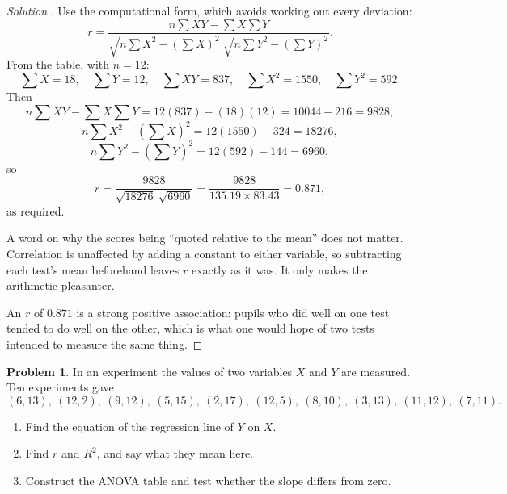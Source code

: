 \documentclass[11pt,a4paper]{article}
\theoremstyle{definition}
\newtheorem{problemx}{Problem}[section]
\newenvironment{problem}{\begin{problemx}}{\end{problemx}}
\newenvironment{solution}
  {\renewcommand{\qedsymbol}{}\begin{proof}[\textit{Solution}.]}
  {\end{proof}}
\begin{document}
\begin{solution}
Use the computational form, which avoids working out every deviation:
\[r=\frac{n\sum XY-\sum X\sum Y}
{\sqrt{n\sum X^2-\left(\sum X\right)^2}\ \sqrt{n\sum Y^2-\left(\sum Y\right)^2}}.\]
From the table, with $n=12$:
\[\sum X=18,\quad \sum Y=12,\quad \sum XY=837,\quad \sum X^2=1550,\quad \sum Y^2=592.\]
Then
\[n\sum XY-\sum X\sum Y = 12(837)-(18)(12)=10044-216=9828,\]
\[n\sum X^2-\left(\sum X\right)^2=12(1550)-324=18276,\]
\[n\sum Y^2-\left(\sum Y\right)^2=12(592)-144=6960,\]
so
\[r=\frac{9828}{\sqrt{18276}\ \sqrt{6960}}=\frac{9828}{135.19\times 83.43}=0.871,\]
as required.

A word on why the scores being ``quoted relative to the mean'' does not matter. Correlation
is unaffected by adding a constant to either variable, so subtracting each test's mean
beforehand leaves $r$ exactly as it was. It only makes the arithmetic pleasanter.

An $r$ of $0.871$ is a strong positive association: pupils who did well on one test tended
to do well on the other, which is what one would hope of two tests intended to measure the
same thing.
\end{solution}

\begin{problem}
In an experiment the values of two variables $X$ and $Y$ are measured. Ten experiments gave
\[(6,13),\ (12,2),\ (9,12),\ (5,15),\ (2,17),\ (12,5),\ (8,10),\ (3,13),\ (11,12),\ (7,11).\]
\begin{enumerate}
\item[(a).] Find the equation of the regression line of $Y$ on $X$.
\item[(b).] Find $r$ and $R^2$, and say what they mean here.
\item[(c).] Construct the ANOVA table and test whether the slope differs from zero.
\end{enumerate}
\end{problem}
\end{document}
